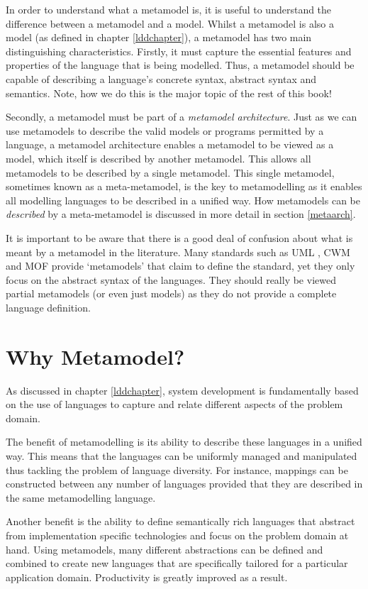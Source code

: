In order to understand what a metamodel is, it is useful to
understand the difference between a metamodel and a model. Whilst
a metamodel is also a model (as defined in chapter
\ref{lddchapter}), a metamodel has two main distinguishing
characteristics. Firstly, it must capture the essential features
and properties of the language that is being modelled. Thus, a
metamodel should be capable of describing a language's concrete
syntax, abstract syntax and semantics. Note, how we do this is the
major topic of the rest of this book!

Secondly, a metamodel must be part of a {\em metamodel
architecture}. Just as we can use metamodels to describe the valid
models or programs permitted by a language, a metamodel
architecture enables a metamodel to be viewed as a model, which
itself is described by another metamodel. This allows all
metamodels to be described by a single metamodel. This single
metamodel, sometimes known as a meta-metamodel, is the key to
metamodelling as it enables all modelling languages to be
described in a unified way. How metamodels can be {\em described}
by a meta-metamodel is discussed in more detail in section
\ref{metaarch}.

It is important to be aware that there is a good deal of confusion
about what is meant by a metamodel in the literature. Many
standards such as UML \cite{umlspec}, CWM \cite{cwmspec} and MOF
\cite{mofspec} provide `metamodels' that claim to define the
standard, yet they only focus on the abstract syntax of the
languages. They should really be viewed partial metamodels (or
even just models) as they do not provide a complete language
definition.

\section{Why Metamodel?}

As discussed in chapter \ref{lddchapter}, system development is
fundamentally based on the use of languages to capture and relate
different aspects of the problem domain.

The benefit of metamodelling is its ability to describe these
languages in a unified way. This means that the languages can be
uniformly managed and manipulated thus tackling the problem of
language diversity. For instance, mappings can be constructed
between any number of languages provided that they are described
in the same metamodelling language.

Another benefit is the ability to define semantically rich
languages that abstract from implementation specific technologies
and focus on the problem domain at hand. Using metamodels, many
different abstractions can be defined and combined to create new
languages that are specifically tailored for a particular
application domain. Productivity is greatly improved as a result.

